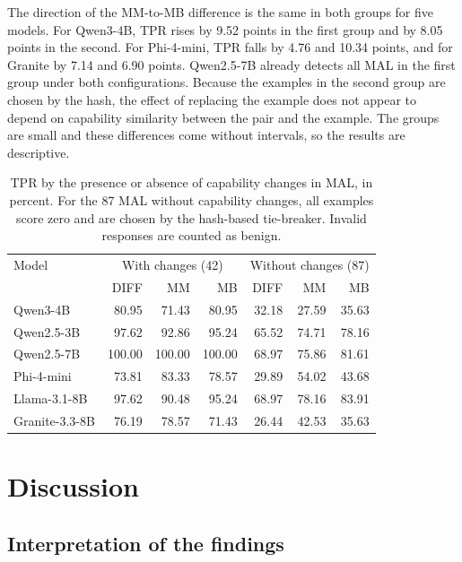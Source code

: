 \documentclass[a4paper,fleqn]{cas-dc}
\begin{document}
The direction of the MM-to-MB difference is the same in both groups for five
models. For Qwen3-4B, TPR rises by 9.52 points in the first group and by 8.05
points in the second. For Phi-4-mini, TPR falls by 4.76 and 10.34 points, and for
Granite by 7.14 and 6.90 points. Qwen2.5-7B already detects all MAL in the first
group under both configurations. Because the examples in the second group are
chosen by the hash, the effect of replacing the example does not appear to depend
on capability similarity between the pair and the example. The groups are small
and these differences come without intervals, so the results are descriptive.
\begin{table}[t]
\centering\small
\caption{TPR by the presence or absence of capability changes in MAL, in percent. For the 87 MAL without capability changes, all examples score zero and are chosen by the hash-based tie-breaker. Invalid responses are counted as benign.}
\label{tab:delta}
\begin{tabular}{lrrrrrr}
\toprule
Model & \multicolumn{3}{c}{With changes (42)} & \multicolumn{3}{c}{Without changes (87)} \\
 & DIFF & MM & MB & DIFF & MM & MB \\
\midrule
Qwen3-4B & 80.95 & 71.43 & 80.95 & 32.18 & 27.59 & 35.63 \\
Qwen2.5-3B & 97.62 & 92.86 & 95.24 & 65.52 & 74.71 & 78.16 \\
Qwen2.5-7B & 100.00 & 100.00 & 100.00 & 68.97 & 75.86 & 81.61 \\
Phi-4-mini & 73.81 & 83.33 & 78.57 & 29.89 & 54.02 & 43.68 \\
Llama-3.1-8B & 97.62 & 90.48 & 95.24 & 68.97 & 78.16 & 83.91 \\
Granite-3.3-8B & 76.19 & 78.57 & 71.43 & 26.44 & 42.53 & 35.63 \\
\bottomrule
\end{tabular}
\end{table}

\section{Discussion}\label{sec:discussion}
\subsection{Interpretation of the findings}
\end{document}
